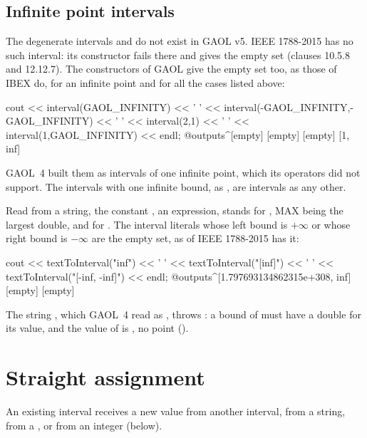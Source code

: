 \subsection{Infinite point intervals}\label{par:inf_inf_note}
%

The degenerate intervals \itv{+\infty}{+\infty} and \itv{-\infty}{-\infty} do
not exist in GAOL v5.\newinvfive{} IEEE 1788-2015 \cite{IEEE1788:2015} has no
such interval: its constructor fails there and gives the empty set (clauses
10.5.8 and 12.12.7). The constructors of GAOL give the empty set too, as
those of IBEX do, for an infinite point and for all the cases listed above:
\begin{example}
cout << interval(GAOL_INFINITY) << ' '
     << interval(-GAOL_INFINITY,-GAOL_INFINITY) << ' '
     << interval(2,1) << ' '
     << interval(1,GAOL_INFINITY) << endl;
@outputs^[empty] [empty] [empty] [1, inf]~
\end{example}
GAOL~4 built them as intervals of one infinite point, which its operators did
not support. The intervals with one infinite bound, as , are
intervals as any other.

\medskip
Read from a string, the constant , an expression, stands for
, MAX being the largest double, and 
for . The interval literals whose left bound is
$+\infty$ or whose right bound is $-\infty$ are the empty set, as
 of IEEE 1788-2015 has it:
\begin{example}
cout << textToInterval("inf") << ' ' << textToInterval("[inf]") << ' '
     << textToInterval("[-inf, -inf]") << endl;
@outputs^[1.797693134862315e+308, inf] [empty] [empty]~
\end{example}
The string , which GAOL~4 read as
, throws : a bound of
 must have a double for its value, and the value of 
is , no point ().\newinvfive

\section{Straight assignment}\label{sec:assignment}
%

An existing interval receives a new value from another interval, from a string,
from a , or from an integer (below).

